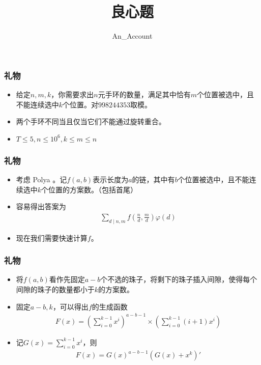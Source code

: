 \documentclass{beamer}
\begin{document}
\begin{frame}
    \title{良心题}
    \author{An\_Account}
    \begin{titlepage}
    \end{titlepage}
\end{frame}

\begin{frame}
    \frametitle{礼物}
    \begin{itemize}
        \item 给定$n, m, k$，你需要求出$n$元手环的数量，满足其中恰有$m$个位置被选中，且不能连续选中$k$个位置。对$998244353$取模。
        \item 两个手环不同当且仅当它们不能通过旋转重合。
        \item $T\leq 5, n\leq 10^6, k\leq m\leq n$
    \end{itemize}
\end{frame}

\begin{frame}
    \frametitle{礼物}
    \begin{itemize}
        \item 考虑 Polya 。记$f(a, b)$表示长度为$a$的链，其中有$b$个位置被选中，且不能连续选中$k$个位置的方案数。（包括首尾）
        \item 容易得出答案为
        $$\begin{aligned}
            \sum_{d\mid n, m} f(\frac nd, \frac md) \varphi(d)
        \end{aligned}$$
        \item 现在我们需要快速计算$f$。
    \end{itemize}
\end{frame}

\begin{frame}
    \frametitle{礼物}
    \begin{itemize}
        \item 将$f(a, b)$看作先固定$a - b$个不选的珠子，将剩下的珠子插入间隙，使得每个间隙的珠子的数量都小于$k$的方案数。
        \item 固定$a - b, k$，可以得出$f$的生成函数 
        $$\begin{aligned}
            F(x) = (\sum_{i = 0}^{k - 1}x^i)^{a - b - 1} \times (\sum_{i = 0}^{k - 1}(i + 1)x^i)
        \end{aligned}$$
        \item 记$G(x) = \sum_{i = 0}^{k - 1} x^i$，则
        $$\begin{aligned}
            F(x) = G(x)^{a - b - 1}(G(x) + x^k)'
        \end{aligned}$$
    \end{itemize}
\end{frame}
\end{document}
